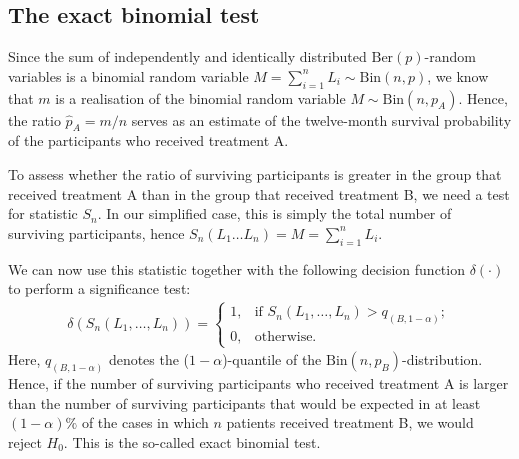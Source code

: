 \subsection{The exact binomial test}
\label{subsec:exact binomial test}
Since the sum of independently and identically distributed $\text{Ber}(p)$-random variables is a binomial random variable $M = \sum_{i=1}^n L_i \sim \text{Bin}(n,p)$, we know that $m$ is a realisation of the binomial random variable ${M \sim \text{Bin}(n,p_A)}$. Hence, the ratio ${\hat{p}_A=m/n}$ serves as an estimate of the twelve-month survival probability of the participants who received treatment A.\par
To assess whether the ratio of surviving participants is greater in the group that received treatment A than in the group that received treatment B, we need a test for statistic $S_n$. In our simplified case, this is simply the total number of surviving participants, hence $S_n(L_1 \dots L_n) = M = \sum_{i=1}^n L_i$.\par
We can now use this statistic together with the following decision function $\delta(\cdot)$ to perform a significance test:
\begin{align*}
    \delta(S_n(L_1,\dots,L_n)) = \begin{cases} 1, & \text{if } S_n(L_1,\dots,L_n) > q_{(B,1-\alpha)}; \\ 0, & \mbox{otherwise.}\end{cases}
\end{align*}
Here, $q_{(B,1-\alpha)}$ denotes the ($1-\alpha$)-quantile of the ${\text{Bin}(n,p_B)}$-distribution. Hence, if the number of surviving participants who received treatment A is larger than the number of surviving participants that would be expected in at least $(1-\alpha)\%$ of the cases in which $n$ patients received treatment B, we would reject $H_0$. This is the so-called exact binomial test. %

